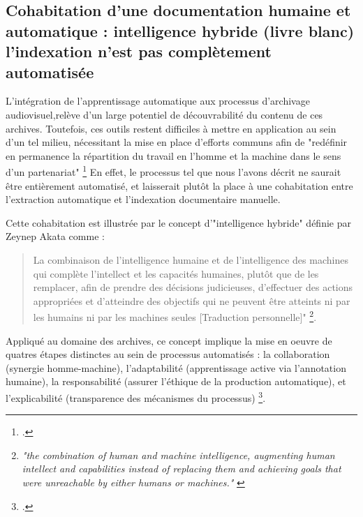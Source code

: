 \subsection{Cohabitation d’une documentation humaine et automatique : intelligence hybride (livre blanc)  l’indexation n’est pas complètement automatisée}

L'intégration de l'apprentissage automatique aux processus d'archivage audiovisuel,relève d'un large potentiel de découvrabilité du contenu de ces archives. Toutefois, ces outils restent difficiles à mettre en application au sein d'un tel milieu, nécessitant la mise en place d'efforts communs afin de "redéfinir en permanence la répartition du travail en l'homme et la machine dans le sens d'un partenariat" \footcite{zotero-item-584} En effet, le processus tel que nous l'avons décrit ne saurait être entièrement automatisé, et laisserait plutôt la place à une cohabitation entre l'extraction automatique et l'indexation documentaire manuelle. 

Cette cohabitation est illustrée par le concept d'"intelligence hybride" définie par Zeynep Akata comme :

\begin{quote}
	La combinaison de l'intelligence humaine et de l'intelligence des machines qui complète l'intellect et les capacités humaines, plutôt que de les remplacer, afin de prendre des décisions judicieuses, d'effectuer des actions appropriées et d'atteindre des objectifs qui ne peuvent être atteints ni par les humains ni par les machines seules [Traduction personnelle]" \footnote{\textit{"the combination of human and machine intelligence, augmenting human intellect and capabilities instead of replacing them and achieving goals that were unreachable by either humans or machines."} \cite{akata2020}}.
\end{quote}
Appliqué au domaine des archives, ce concept implique la mise en oeuvre de quatres étapes distinctes au sein de processus automatisés : la collaboration (synergie homme-machine), l'adaptabilité (apprentissage active via l'annotation humaine), la responsabilité (assurer l'éthique de la production automatique), et l'explicabilité (transparence des mécanismes du processus) \footcite{akata2020}.


